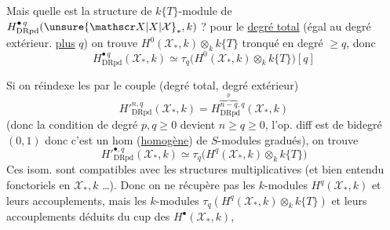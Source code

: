 Mais quelle est  la structure de $k\{T\}$-module de $H^{\bullet\,q}_{\mathrm{DRpd}}(\unsure{\mathscr X|X|\mathcal X}_{\ast},k)$ ?  pour le \uline{degré total} (égal au degré extérieur. \uline{plus} $q$) on trouve $H^0(\mathscr X_\ast,k)\otimes_k k\{T\}$ tronqué en degré $\geq q$, donc
\[
H^{\bullet\,q}_{\mathrm{DRpd}}(\mathscr X_{\ast},k)\simeq\tau_q\big(H^0(\mathscr X_{\ast},k)\otimes_k k\{T\}\big)[q]
\]

Si on réindexe les  par le couple (degré total, degré extérieur)
\[
{H'}^{n,q}_{\mathrm{DRpd}}(\mathscr X_{\ast},k)=H^{\overbrace{n-q}^{p},q}_{\mathrm{DRpd}}(\mathscr X_{\ast},k)
\]
(donc la condition de degré $p,q\geq0$ devient $n\geq q\geq 0$, l'op. diff est de bidegré $(0,1)$ donc c'est un hom (\uline{homogène}) de $S$-modules gradués), on trouve
\[
{H'}^{\bullet,q}_{\mathrm{DRpd}}(\mathscr X_\ast,k)\simeq\tau_q\big(H^q(\mathscr X_\ast,k)\otimes_k k\{T\}\big)
\]
Ces isom. sont compatibles avec les structures multiplicatives (et bien entendu fonctoriels en $\mathscr X_{\ast},k$ \ldots). Donc  on ne récupère  pas les $k$-modules $H^q(\mathscr X_{\ast},k)$ et leurs accouplements, mais les $k$-modules  $\tau_q(H^q(\mathscr X_{\ast},k)\otimes_k k\{T\})$ et leurs accouplements déduits du cup des $H^\bullet(\mathscr X_{\ast},k)$,

